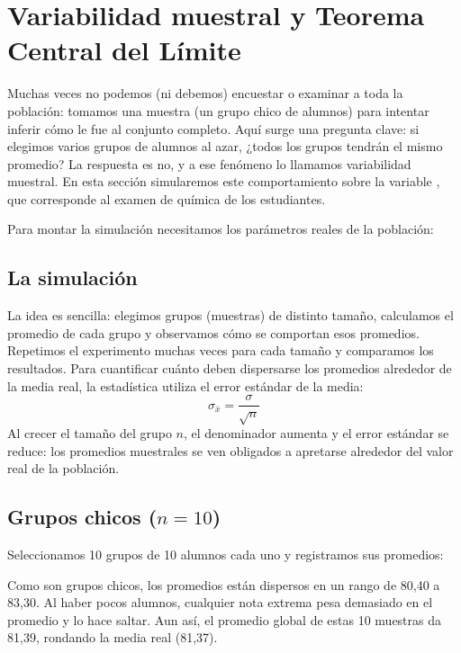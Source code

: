 \section{Variabilidad muestral y Teorema Central del Límite}
Muchas veces no podemos (ni debemos) encuestar o examinar a toda la población: tomamos una
muestra (un grupo chico de alumnos) para intentar inferir cómo le fue al conjunto completo. Aquí
surge una pregunta clave: si elegimos varios grupos de alumnos al azar, ¿todos los grupos tendrán
el mismo promedio? La respuesta es no, y a ese fenómeno lo llamamos variabilidad muestral. En
esta sección simularemos este comportamiento sobre la variable , que
corresponde al examen de química de los estudiantes.

\AnalisisDescriptivo
Para montar la simulación necesitamos los parámetros reales de la población:


\subsection{La simulación}
La idea es sencilla: elegimos grupos (muestras) de distinto tamaño, calculamos el promedio de
cada grupo y observamos cómo se comportan esos promedios. Repetimos el experimento muchas veces
para cada tamaño y comparamos los resultados. Para cuantificar cuánto deben dispersarse los
promedios alrededor de la media real, la estadística utiliza el error estándar de la media:
\begin{equation*}
  \sigma_{\bar{x}} = \frac{\sigma}{\sqrt{n}}
\end{equation*}
 Al crecer el tamaño del grupo $n$, el denominador
aumenta y el error estándar se reduce: los promedios muestrales se ven obligados a apretarse
alrededor del valor real de la población.

\subsection{Grupos chicos ($n = 10$)}
Seleccionamos 10 grupos de 10 alumnos cada uno y registramos sus promedios:

\TablaDeDatos


 Como son grupos chicos, los promedios están dispersos en un
rango de 80,40 a 83,30. Al haber pocos alumnos, cualquier nota extrema pesa demasiado en el
promedio y lo hace saltar. Aun así, el promedio global de estas 10 muestras da 81,39, rondando
la media real (81,37).

